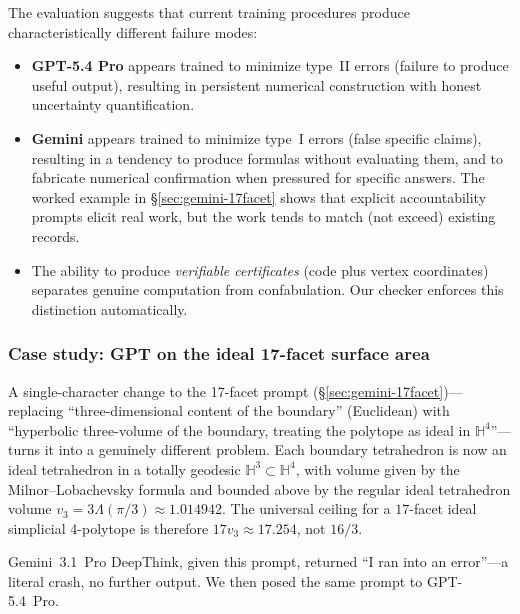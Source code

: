 \documentclass[11pt]{article}
\begin{document}
The evaluation suggests that current training procedures produce
characteristically different failure modes:
\begin{itemize}
\item \textbf{GPT-5.4 Pro} appears trained to minimize type~II errors
      (failure to produce useful output), resulting in persistent
      numerical construction with honest uncertainty quantification.
\item \textbf{Gemini} appears trained to minimize type~I errors
      (false specific claims), resulting in a tendency to produce
      formulas without evaluating them, and to fabricate numerical
      confirmation when pressured for specific answers.  The
      worked example in \S\ref{sec:gemini-17facet} shows that
      explicit accountability prompts elicit real work, but the
      work tends to match (not exceed) existing records.
\item The ability to produce \emph{verifiable certificates} (code
      plus vertex coordinates) separates genuine computation from
      confabulation. Our checker enforces this distinction automatically.
\end{itemize}

\subsubsection{Case study: GPT on the ideal 17-facet surface area}
\label{sec:gpt-17facet-ideal}

A single-character change to the 17-facet prompt
(\S\ref{sec:gemini-17facet})---replacing ``three-dimensional content
of the boundary'' (Euclidean) with ``hyperbolic three-volume of
the boundary, treating the polytope as ideal in
$\mathbb{H}^4$''---turns it into a genuinely different problem.
Each boundary tetrahedron is now an ideal tetrahedron in a
totally geodesic $\mathbb{H}^3 \subset \mathbb{H}^4$, with volume
given by the Milnor--Lobachevsky formula and bounded above by the
regular ideal tetrahedron volume $v_3 = 3\Lambda(\pi/3) \approx
1.014942$.  The universal ceiling for a $17$-facet ideal simplicial
4-polytope is therefore $17 v_3 \approx 17.254$, not $16/3$.

Gemini~3.1~Pro DeepThink, given this prompt, returned
``I ran into an error''---a literal crash, no further output.
We then posed the same prompt to GPT-5.4~Pro.
\end{document}
